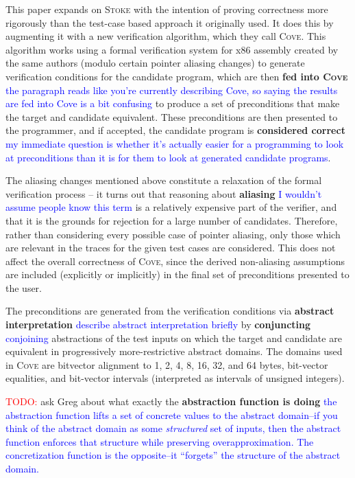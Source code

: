 \documentclass[12pt,twoside]{reedthesis}
\newcommand{\red}[1]{\textcolor{red}{#1}}
\newcommand{\comment}[2]{\textbf{#1} \textcolor{blue}{#2}}
\begin{document}
This paper expands on \textsc{Stoke} with the intention of proving correctness more rigorously than the test-case based approach it originally used.
It does this by augmenting it with a new verification algorithm, which they call \textsc{Cove}.
This algorithm works using a formal verification system for x86 assembly created by the same authors \cite{sharma2013ddec} (modulo certain pointer aliasing changes) to generate verification conditions for the candidate program, which are then \comment{fed into \textsc{Cove}}{the paragraph reads like you're currently describing Cove, so saying the results are fed into Cove is a bit confusing} to produce a set of preconditions that make the target and candidate equivalent. These preconditions are then presented to the programmer, and if accepted, the candidate program is \comment{considered correct}{my immediate question is whether it's actually easier for a programming to look at preconditions than it is for them to look at generated candidate programs}.
    
The aliasing changes mentioned above constitute a relaxation of the formal verification process -- it turns out that reasoning about \comment{aliasing}{I wouldn't assume people know this term} is a relatively expensive part of the verifier, and that it is the grounds for rejection for a large number of candidates. Therefore, rather than considering every possible case of pointer aliasing, only those which are relevant in the traces for the given test cases are considered. This does not affect the overall correctness of \textsc{Cove}, since the derived non-aliasing assumptions are included (explicitly or implicitly) in the final set of preconditions presented to the user.
    
The preconditions are generated from the verification conditions via \comment{abstract interpretation}{describe abstract interpretation briefly} by \comment{conjuncting}{conjoining} abstractions of the test inputs on which the target and candidate are equivalent in progressively more-restrictive abstract domains. The domains used in \textsc{Cove} are bitvector alignment to 1, 2, 4, 8, 16, 32, and 64 bytes, bit-vector equalities, and bit-vector intervals (interpreted as intervals of unsigned integers).
    
\red{TODO:} ask Greg about what exactly the \comment{abstraction function is doing}{the abstraction function lifts a set of concrete values to the abstract domain--if you think of the abstract domain as some \emph{structured} set of inputs, then the abstract function enforces that structure while preserving overapproximation. The concretization function is the opposite--it ``forgets'' the structure of the abstract domain.}
\end{document}
